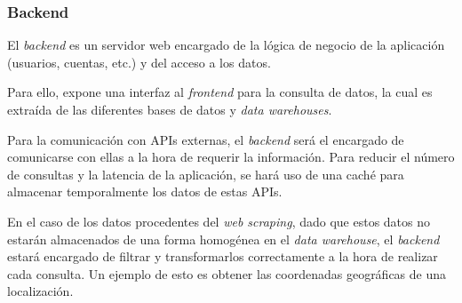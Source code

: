 \subsubsection{Backend}
El \textit{backend} es un servidor web encargado de la lógica de negocio de la 
aplicación (usuarios, cuentas, etc.) y del acceso a los datos.

Para ello, expone una interfaz al \textit{frontend} para la consulta de datos,
la cual es extraída de las diferentes bases de datos y \textit{data warehouses}.

Para la comunicación con APIs externas, el \textit{backend} será el encargado
de comunicarse con ellas a la hora de requerir la información. Para reducir el
número de consultas y la latencia de la aplicación, se hará uso de una caché para almacenar temporalmente los datos de estas APIs.

En el caso de los datos procedentes del \textit{web scraping}, dado que estos
datos no estarán almacenados de una forma homogénea en el \textit{data 
warehouse}, el \textit{backend} estará encargado de filtrar y transformarlos
correctamente a la hora de realizar cada consulta. Un ejemplo de esto es obtener
las coordenadas geográficas de una localización.
